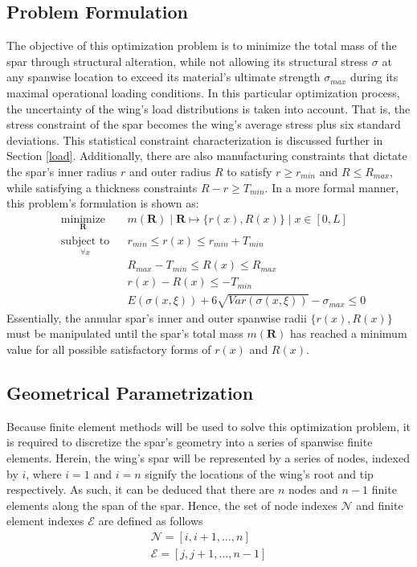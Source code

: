 \documentclass{article}
\begin{document}
\subsection{Problem Formulation}\label{opt}
The objective of this optimization problem is to minimize the total mass of the spar through structural alteration, while not allowing its structural stress $\sigma$ at any spanwise location to exceed its material's ultimate strength $\sigma_{max}$ during its maximal operational loading conditions. In this particular optimization process, the uncertainty of the wing's load distributions is taken into account. That is, the stress constraint of the spar becomes the wing's average stress plus six standard deviations. This statistical constraint characterization is discussed further in Section \ref{load}. Additionally, there are also manufacturing constraints that dictate the spar's inner radius $r$ and outer radius $R$ to satisfy $r \geq r_{min}$ and $R \leq R_{max}$, while satisfying a thickness constraints $R - r \geq T_{min}$. In a more formal manner, this problem's formulation is shown as:
$$
\begin{aligned}
& \underset{\mathbf{R}}{\text{minimize}} 
& & m(\mathbf{R}) \mid \mathbf{R} \mapsto \{ r(x), R(x) \} \mid x \in [0,L] \\
& \underset{\forall x}{\text{subject to}}
& &  r_{min} \leq r(x) \leq r_{min} + T_{min}\\
& & & R_{max} - T_{min} \leq R(x) \leq R_{max}\\
& & & r(x) - R(x) \leq -T_{min} \\
& & & E(\sigma(x,\xi)) + 6\sqrt{Var(\sigma(x,\xi))} - \sigma_{max} \leq 0
\end{aligned}
$$
Essentially, the annular spar's inner and outer spanwise radii $\{ r(x), R(x) \}$ must be manipulated until the spar's total mass $m(\mathbf{R})$ has reached a minimum value for all possible satisfactory forms of $r(x)$ and $R(x)$. 

\subsection{Geometrical Parametrization}
Because finite element methods will be used to solve this optimization problem, it is required to discretize the spar's geometry into a series of spanwise finite elements. Herein, the wing's spar will be represented by a series of nodes, indexed by $i$, where $i=1$ and $i=n$ signify the locations of the wing's root and tip respectively. As such, it can be deduced that there are $n$ nodes and $n-1$ finite elements along the span of the spar. Hence, the set of node indexes $\mathcal{N}$ and finite element indexes $\mathcal{E}$ are defined as follows
$$
\begin{gathered}
\mathcal{N} = [i, i+1, \dots, n] \\
\mathcal{E} = [j, j+1, \dots, n-1]
\end{gathered}
$$
\end{document}
